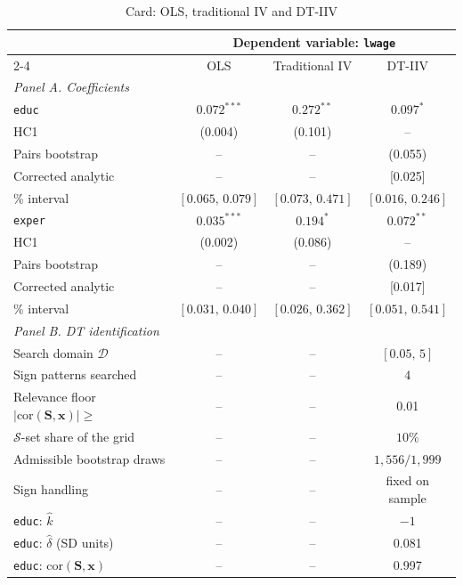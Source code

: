 \begin{table}[htbp]
\centering
\caption{Card: OLS, traditional IV and DT-IIV}
\label{tab:card_results}
\begin{threeparttable}
\begin{tabular}{lccc}
\toprule
& \multicolumn{3}{c}{Dependent variable: \texttt{lwage}} \\
\cmidrule(lr){2-4}
 & OLS & Traditional IV & DT-IIV \\
\midrule
\multicolumn{4}{l}{\emph{Panel A. Coefficients}} \\
\texttt{educ} & $0.072^{***}$ & $0.272^{**}$ & $0.097^{*}$ \\
\quad HC1 & (0.004) & (0.101) & -- \\
\quad Pairs bootstrap & -- & -- & (0.055) \\
\quad Corrected analytic & -- & -- & [0.025] \\
\quad 95\% interval & $[0.065,\,0.079]$ & $[0.073,\,0.471]$ & $[0.016,\,0.246]$ \\[3pt]
\texttt{exper} & $0.035^{***}$ & $0.194^{*}$ & $0.072^{**}$ \\
\quad HC1 & (0.002) & (0.086) & -- \\
\quad Pairs bootstrap & -- & -- & (0.189) \\
\quad Corrected analytic & -- & -- & [0.017] \\
\quad 95\% interval & $[0.031,\,0.040]$ & $[0.026,\,0.362]$ & $[0.051,\,0.541]$ \\[3pt]
\midrule
\multicolumn{4}{l}{\emph{Panel B. DT identification}} \\
\quad Search domain $\mathcal D$ & -- & -- & $[0.05,\,5]$ \\
\quad Sign patterns searched & -- & -- & $4$ \\
\quad Relevance floor $|\mathrm{cor}(\mathbf S,\mathbf x)|\ge$ & -- & -- & 0.01 \\
\quad $\mathcal S$-set share of the grid & -- & -- & $10$\% \\
\quad Admissible bootstrap draws & -- & -- & $1{,}556/1{,}999$ \\
\quad Sign handling & -- & -- & fixed on sample \\
\quad \texttt{educ}: $\widehat k$ & -- & -- & $-1$ \\
\quad \texttt{educ}: $\widehat\delta$ (SD units) & -- & -- & 0.081 \\
\quad \texttt{educ}: $\mathrm{cor}(\mathbf S,\mathbf x)$ & -- & -- & 0.997 \\

\end{tabular}
\end{threeparttable}
\end{table}
